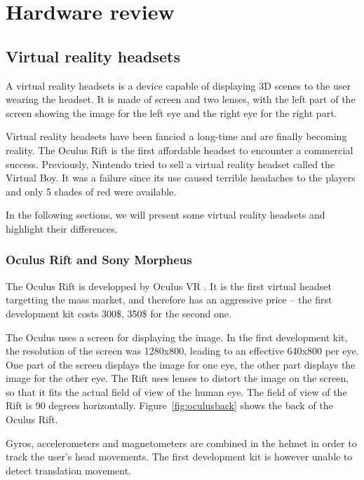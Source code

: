 \documentclass[12pt]{article}
\begin{document}
\section{Hardware review}
\subsection{Virtual reality headsets}
A virtual reality headsets is a device capable of displaying 3D scenes to the user wearing the headset. It is made of screen and two lenses, with the left part of the screen showing the image for the left eye and the right eye for the right part.

Virtual reality headsets have been fancied a long-time and are finally becoming reality. The Oculus Rift is the first affordable headset to encounter a commercial success. Previously, Nintendo tried to sell a virtual reality headset called the Virtual Boy. It was a failure since its use caused terrible headaches to the players and only 5 shades of red were available.

In the following sections, we will present some virtual reality headsets and highlight their differences.

\subsubsection{Oculus Rift and Sony Morpheus}
The Oculus Rift is developped by Oculus VR \cite{Oculus}. It is the first virtual headset targetting the mass market, and therefore has an aggressive price -- the first development kit costs 300\$, 350\$ for the second one.

The Oculus uses a screen for displaying the image. In the first development kit, the resolution of the screen was 1280x800, leading to an effective 640x800 per eye. One part of the screen displays the image for one eye, the other part displays the image for the other eye. The Rift uses lenses to distort the image on the screen, so that it fits the actual field of view of the human eye. The field of view of the Rift is 90 degrees horizontally. Figure~\ref{fig:oculusback} shows the back of the Oculus Rift.

Gyros, accelerometers and magnetometers are combined in the helmet in order to track the user's head movements. The first development kit is however unable to detect translation movement.
\end{document}
